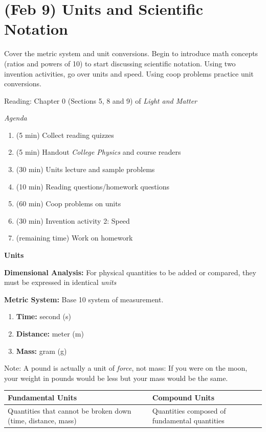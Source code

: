 \documentclass[12pt]{article}
\begin{document}
\section{(Feb 9) \textbf{Units and Scientific Notation}}
	
	Cover the metric system and unit conversions. Begin to introduce math concepts (ratios and powers of 10) to start discussing scientific notation. Using two invention activities, go over units and speed. Using coop problems practice unit conversions.
	
	Reading: Chapter 0 (Sections 5, 8 and 9) of \textit{Light and Matter}
	
	\textit{Agenda}
	
	\begin{enumerate}
		\item (5 min) Collect reading quizzes
		\item (5 min) Handout \textit{College Physics} and course readers
		\item (30 min) Units lecture and sample problems
		\item (10 min) Reading questions/homework questions
		\item (60 min) Coop problems on units
		\item (30 min) Invention activity 2: Speed
		\item (remaining time) Work on homework
	
	\end{enumerate}
	
\noindent \textbf{\large Units}
	
\noindent \textbf{Dimensional Analysis:} For physical quantities to be added or compared, they must be expressed in identical \textit{units}

\noindent \textbf{Metric System:} Base 10 system of measurement.

\begin{enumerate}
	\item \textbf{Time:} second (s)
	\item \textbf{Distance:} meter (m)
	\item \textbf{Mass:} gram (g)
\end{enumerate}

Note: A pound is actually a unit of \textit{force}, not mass: If you were on the moon, your weight in pounds would be less but your mass would be the same.
\vspace{0.1in}

\noindent \begin{tabularx}{\textwidth}{X | X}
	Fundamental Units & Compound Units \\ \hline
	Quantities that cannot be broken down (time, distance, mass) & Quantities composed of fundamental quantities
\end{tabularx}
\end{document}
